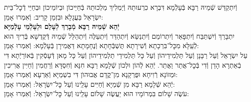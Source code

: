 \documentclass[twoside, openany, parskip=half, 11pt]{book}
\begin{document}
\begin{kaddish}

וְֿיִתְקַדַּשׁ שְֿׁמֵיהּ רַבָּא בְּֿעָלְֿמָא דִּבְרָא כִרְעוּתֵהּ
וְֿיַמְלִיךְ מַלְכוּתֵהּ בְּֿחַיֵּיכוֹן וּבְיוֹמֵיכוֹן וּבְחַיֵּי דְֿכׇל־בֵּית יִשְׂרָאֵל בַּעֲגָלָא וּבִזְמַן קָרִיב: וְֿאִמְרוּ אָמֵן: \\
\textbf{יְֿהֵא שְֿׁמֵיהּ רַבָּא מְֿבָרַךְ לְֿעָלַם וּלְעָלְֿמֵי עָלְֿמַיָּא}\\
יִתְבָּרַךְ וְֿיִשְׁתַּבַּח וְֿיִתְפָּאַר וְֿיִתְרוֹמַם וְֿיִתְנַשֵּׂא
וְֿיִתְהַדַּר וְֿיִתְעַלֶּה וְֿיִתְהַלַּל שְֿׁמֵיהּ דְּֿקֻדְשָׁא בְּֿרִיךְ הוּא
לְֿעֵֽלָּא מִכׇּל־בִּרְכָתָא וְֿשִׁירָתָא תֻּשְׁבְּֿחָתָא וְֿנֶחָמָתָא
דַּאֲמִירָן בְּֿעָלְֿמָא: וְֿאִמְרוּ אָמֵן:\\
עַל יִשְׂרָאֵל וְֿעַל רַבָּנָן וְֿעַל תַּלְמִידֵיהוֹן וְֿעַל כָּל תַּלְמִידֵי תַלְמִידֵיהוֹן וְֿעַל כָּל מָאן דְּֿעָסְֿקִין בְּֿאוֹרַיְֿתָא דִּי בְֿאַתְרָא הָדֵן וְֿדִי בְּֿכׇל־אֲתַר וַאֲתַר. יְֿהֵא לְֿהוֹן וּלְכוֹן שְֿׁלָמָא רַבָּא חִנָּא וְֿחִסְדָּא וְֿרַחֲמִין וְֿחַיִּין אֲרִיכִין וּמְזוֹנָא רְֿוִיחָא וּפֻרְקָנָא מִן־קֳדָם אֲבוּהוׂן דִּי בִשְׁמַיָּא וְֿאַרְעָא וְֿאִמְרוּ אָמֵן:\\
יְֿהֵא שְֿׁלָמָא רַבָּא מִן שְֿׁמַיָּא וְֿחַיִּים עָלֵֽינוּ וְֿעַל כׇּל־יִשְׂרָאֵל: וְֿאִמְרוּ אָמֵן:\\
עֹשֶׂה שָׁלוֹם בִּמְרוֹמָיו הוּא יַעֲשֶׂה שָׁלוֹם עָלֵֽינוּ וְֿעַל כׇּל־יִשְׂרָאֵל: וְֿאִמְרוּ אָמֵן:
\end{kaddish}

\vfill
{}\quad{}\quad{}
\end{document}
